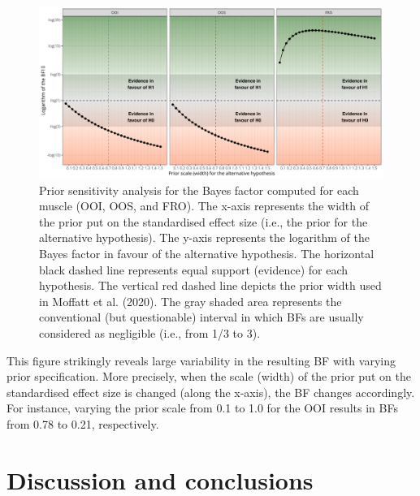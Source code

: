 \documentclass[
  english,
  man, donotrepeattitle,mask,floatsintext]{apa6}
\begin{document}
\begin{figure}[!h]

{\centering \includegraphics[width=1\linewidth]{manuscript_files/figure-latex/sensitivity-1} 

}

\caption{Prior sensitivity analysis for the Bayes factor computed for each muscle (OOI, OOS, and FRO). The x-axis represents the width of the prior put on the standardised effect size (i.e., the prior for the alternative hypothesis). The y-axis represents the logarithm of the Bayes factor in favour of the alternative hypothesis. The horizontal black dashed line represents equal support (evidence) for each hypothesis. The vertical red dashed line depicts the prior width used in Moffatt et al. (2020). The gray shaded area represents the conventional (but questionable) interval in which BFs are usually considered as negligible (i.e., from 1/3 to 3).}\label{fig:sensitivity}
\end{figure}

This figure strikingly reveals large variability in the resulting BF with varying prior specification. More precisely, when the scale (width) of the prior put on the standardised effect size is changed (along the x-axis), the BF changes accordingly. For instance, varying the prior scale from 0.1 to 1.0 for the OOI results in BFs from 0.78 to 0.21, respectively.

\hypertarget{discussion-and-conclusions}{%
\section{Discussion and conclusions}\label{discussion-and-conclusions}}
\end{document}

